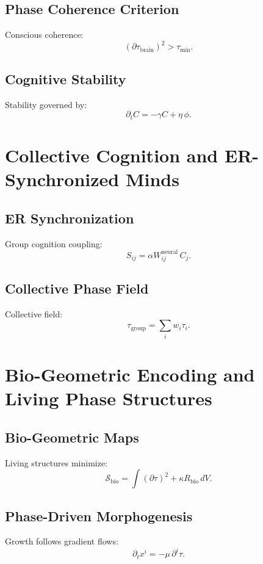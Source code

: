 \section{Phase Coherence Criterion}
Conscious coherence:
\[
(\partial\tau_{\mathrm{brain}})^2 > \tau_{\mathrm{min}}.
\]

\section{Cognitive Stability}
Stability governed by:
\[
\partial_t C = -\gamma C + \eta\,\phi.
\]

\chapter{Collective Cognition and ER-Synchronized Minds}

\section{ER Synchronization}
Group cognition coupling:
\[
S_{ij} = \alpha W^{\mathrm{neural}}_{ij}\, C_j.
\]

\section{Collective Phase Field}
Collective field:
\[
\tau_{\mathrm{group}} = \sum_i w_i \tau_i.
\]

\chapter{Bio-Geometric Encoding and Living Phase Structures}

\section{Bio-Geometric Maps}
Living structures minimize:
\[
\mathcal{S}_{\mathrm{bio}} = \int (\partial\tau)^2 + \kappa R_{\mathrm{bio}}\, dV.
\]

\section{Phase-Driven Morphogenesis}
Growth follows gradient flows:
\[
\partial_t x^i = -\mu\, \partial^i \tau.
\]
